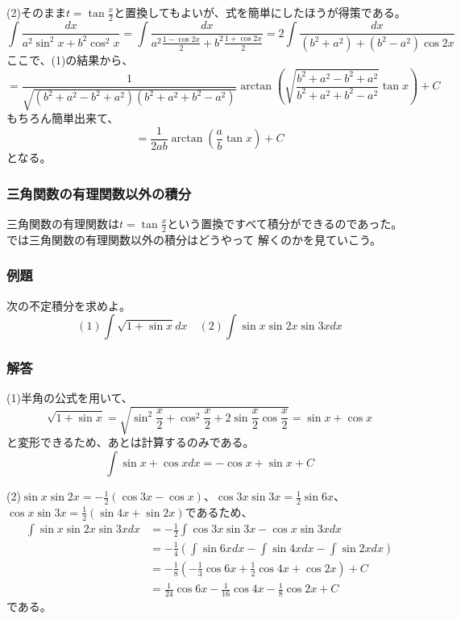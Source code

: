 \documentclass[a4j,dvipdfmx]{jsarticle}
\begin{document}
(2)そのまま$t=\tan\frac{x}{2}$と置換してもよいが、式を簡単にしたほうが得策である。
\begin{equation*}
    \int \frac{dx}{a^2\sin^2 x+b^2\cos^2 x}=\int\frac{dx}{a^2\frac{1-\cos 2x}{2}+b^2\frac{1+\cos 2x}{2}}=2\int\frac{dx}{(b^2+a^2)+(b^2-a^2)\cos2x}
\end{equation*}
ここで、(1)の結果から、
\begin{equation*}
    =\frac{1}{\sqrt{(b^2+a^2-b^2+a^2)(b^2+a^2+b^2-a^2)}}\arctan\left(\sqrt{\frac{b^2+a^2-b^2+a^2}{b^2+a^2+b^2-a^2}}\tan x\right)+C
\end{equation*}
もちろん簡単出来て、
\begin{equation*}
    =\frac{1}{2ab}\arctan\left(\frac{a}{b}\tan x\right)+C
\end{equation*}
となる。
\newpage
\subsubsection{三角関数の有理関数以外の積分}
三角関数の有理関数は$t=\tan \frac{x}{2}$という置換ですべて積分ができるのであった。では三角関数の有理関数以外の積分はどうやって
解くのかを見ていこう。

\subsubsection*{例題}
次の不定積分を求めよ。
\begin{equation*}
    (1)\int \sqrt{1+\sin x}dx\quad (2)\int \sin x\sin 2x\sin 3xdx
\end{equation*}
\subsubsection*{解答}
(1)半角の公式を用いて、
\begin{equation*}
    \sqrt{1+\sin x}=\sqrt{\sin^2\frac{x}{2}+\cos^2\frac{x}{2}+2\sin\frac{x}{2}\cos\frac{x}{2}}=\sin x+\cos x
\end{equation*}
と変形できるため、あとは計算するのみである。
\begin{equation*}
    \int \sin x+\cos x dx= -\cos x+\sin x+C
\end{equation*}

(2)$\sin x\sin 2x=-\frac{1}{2}(\cos 3x -\cos x)$、$\cos 3x\sin 3x=\frac{1}{2}\sin 6x$、$\cos x\sin 3x=\frac{1}{2}(\sin 4x+\sin 2x)$であるため、
\begin{align*}
    \int \sin x\sin 2x\sin 3xdx&=-\frac{1}{2}\int\cos 3x\sin 3x-\cos x\sin 3xdx\\
    &=-\frac{1}{4}(\int\sin 6xdx -\int\sin 4xdx-\int\sin 2xdx)\\
    &=-\frac{1}{8}(-\frac{1}{3}\cos 6x+\frac{1}{2}\cos 4x+\cos 2x)+C\\
    &=\frac{1}{24}\cos 6x-\frac{1}{16}\cos 4x-\frac{1}{8}\cos 2x+C
\end{align*}
である。
\newpage
\end{document}
